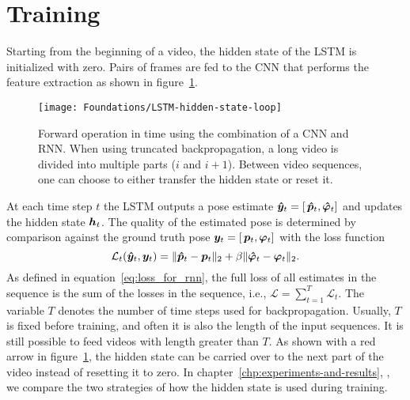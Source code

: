 	\section{Training}
		Starting from the beginning of a video, the hidden state of the LSTM is initialized with zero.
		Pairs of frames are fed to the CNN that performs the feature extraction as shown in figure~\ref{fig:LSTM-ways-to-use-hidden-state}.
		\begin{figure}[t]
			\centering
			\texttt{[image: Foundations/LSTM-hidden-state-loop]}
			\caption[Forward operation in time using CNN and RNN]
					{Forward operation in time using the combination of a CNN and RNN. 
					 When using truncated backpropagation, a long video is divided into multiple parts ($i$ and $i + 1$).
					 Between video sequences, one can choose to either transfer the hidden state or reset it.
					 \label{fig:LSTM-ways-to-use-hidden-state}}
		\end{figure}
		At each time step $t$ the LSTM outputs a pose estimate 
		$\bm{\hat{y}}_t = \left[ \, \bm{\hat{p}}_t,  \bm{\hat{\varphi}}_t \right]$ 
		and updates the hidden state $\bm{h}_t$.
		The quality of the estimated pose is determined by comparison against the ground truth pose 
		$\bm{y}_t = \left[ \, \bm{p}_t,  \bm{\varphi}_t \right]$
		with the loss function
		\begin{equation}\label{eq:euler_pose_loss_function_t}
			\mathcal{L}_t(\bm{\hat{y}}_t, \bm{y}_t) = 
				\lVert \bm{\hat{p}}_t - \bm{p}_t \rVert_2 + 
				\beta \lVert \bm{\hat{\varphi}}_t - \bm{\varphi}_t \rVert_2.
		\end{equation}
		As defined in equation~\ref{eq:loss_for_rnn}, the full loss of all estimates in the sequence is the sum of the losses in the sequence, i.e., 
		$\mathcal{L} = \sum_{t = 1}^{T} \mathcal{L}_t$.
		The variable $T$ denotes the number of time steps used for backpropagation.
		Usually, $T$ is fixed before training, and often it is also the length of the input sequences.
		It is still possible to feed videos with length greater than $T$.
		As shown with a red arrow in figure~\ref{fig:LSTM-ways-to-use-hidden-state}, the hidden state can be carried over to the next part of the video instead of resetting it to zero.
		In chapter~\ref{chp:experiments-and-results}, , we compare the two strategies of how the hidden state is used during training.
		

